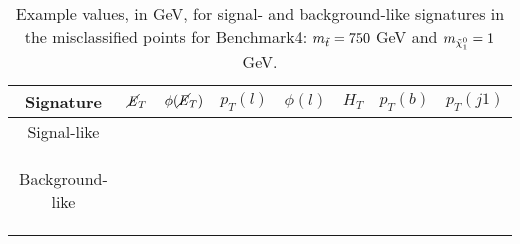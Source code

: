 

\begin{table}[htbp]
    \centering
    \begin{tabular}{c||c|c|c|c|c|c|c}
        \toprule
        \textbf{Signature} & $\cancel{\it{E}}_{T}$ & $\phi(\cancel{\it{E}}_{T})$ & $p_T(l)$ & $\phi(l)$ & $H_T$ & $p_T(b)$ & $p_T(j1)$ \\
        \midrule
        \multirow{3.75}{*}{Signal-like} & \cellcolor{gray!6}\\
        \\
        &\cellcolor{gray!6}\\
        \\
        \midrule
        \multirow{3.75}{*}{Background-like}&\cellcolor{gray!6}  \\
        \\
        &\cellcolor{gray!6}\\
        \\
        \bottomrule
    \end{tabular}
    \caption{ Example values, in GeV, for signal- and background-like signatures in the misclassified points for Benchmark4: $m_{\Tilde{t}} = 750$ GeV and $m_{\Tilde{\chi}_1^0} = 1$ GeV.}
\end{table}
